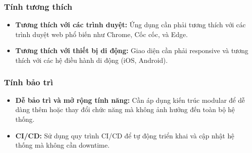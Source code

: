 \subsubsection{Tính tương thích}
\begin{itemize}
    \item \textbf{Tương thích với các trình duyệt:} Ứng dụng cần phải tương thích với các trình duyệt web phổ biến như Chrome, Cốc cốc, và Edge.
    \item \textbf{Tương thích với thiết bị di động:} Giao diện cần phải responsive và tương thích với các hệ điều hành di động (iOS, Android).
\end{itemize}

\subsubsection{Tính bảo trì}
\begin{itemize}
    \item \textbf{Dễ bảo trì và mở rộng tính năng:} Cần áp dụng kiến trúc modular để dễ dàng thêm hoặc thay đổi chức năng mà không ảnh hưởng đến toàn bộ hệ thống.
    \item \textbf{CI/CD:} Sử dụng quy trình CI/CD để tự động triển khai và cập nhật hệ thống mà không cần downtime.
\end{itemize}
